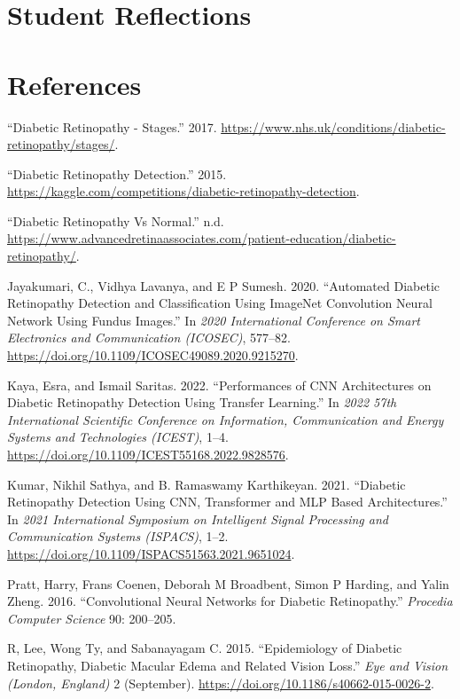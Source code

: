 \documentclass[
]{article}
\newlength{\cslhangindent}
\newlength{\cslentryspacingunit} %
\newenvironment{CSLReferences}[2] %
 {%
  \setlength{\parindent}{0pt}
  \ifodd #1
  \let\oldpar\par
  \def\par{\hangindent=\cslhangindent\oldpar}
  \fi
  \setlength{\parskip}{#2\cslentryspacingunit}
 }%
 {}
\begin{document}
\hypertarget{student-reflections}{%
\section{Student Reflections}\label{student-reflections}}

\newpage

\hypertarget{references}{%
\section{References}\label{references}}

\hypertarget{refs}{}
\begin{CSLReferences}{1}{0}
\leavevmode{}%
{``Diabetic Retinopathy - Stages.''} 2017.
\url{https://www.nhs.uk/conditions/diabetic-retinopathy/stages/}.

\leavevmode{}%
{``Diabetic Retinopathy Detection.''} 2015.
\url{https://kaggle.com/competitions/diabetic-retinopathy-detection}.

\leavevmode{}%
{``Diabetic Retinopathy Vs Normal.''} n.d.
\url{https://www.advancedretinaassociates.com/patient-education/diabetic-retinopathy/}.

\leavevmode{}%
Jayakumari, C., Vidhya Lavanya, and E P Sumesh. 2020. {``Automated
Diabetic Retinopathy Detection and Classification Using ImageNet
Convolution Neural Network Using Fundus Images.''} In \emph{2020
International Conference on Smart Electronics and Communication
(ICOSEC)}, 577--82.
\url{https://doi.org/10.1109/ICOSEC49089.2020.9215270}.

\leavevmode{}%
Kaya, Esra, and Ismail Saritas. 2022. {``Performances of CNN
Architectures on Diabetic Retinopathy Detection Using Transfer
Learning.''} In \emph{2022 57th International Scientific Conference on
Information, Communication and Energy Systems and Technologies (ICEST)},
1--4. \url{https://doi.org/10.1109/ICEST55168.2022.9828576}.

\leavevmode{}%
Kumar, Nikhil Sathya, and B. Ramaswamy Karthikeyan. 2021. {``Diabetic
Retinopathy Detection Using CNN, Transformer and MLP Based
Architectures.''} In \emph{2021 International Symposium on Intelligent
Signal Processing and Communication Systems (ISPACS)}, 1--2.
\url{https://doi.org/10.1109/ISPACS51563.2021.9651024}.

\leavevmode{}%
Pratt, Harry, Frans Coenen, Deborah M Broadbent, Simon P Harding, and
Yalin Zheng. 2016. {``Convolutional Neural Networks for Diabetic
Retinopathy.''} \emph{Procedia Computer Science} 90: 200--205.

\leavevmode{}%
R, Lee, Wong Ty, and Sabanayagam C. 2015. {``Epidemiology of Diabetic
Retinopathy, Diabetic Macular Edema and Related Vision Loss.''}
\emph{Eye and Vision (London, England)} 2 (September).
\url{https://doi.org/10.1186/s40662-015-0026-2}.

\end{CSLReferences}
\end{document}
